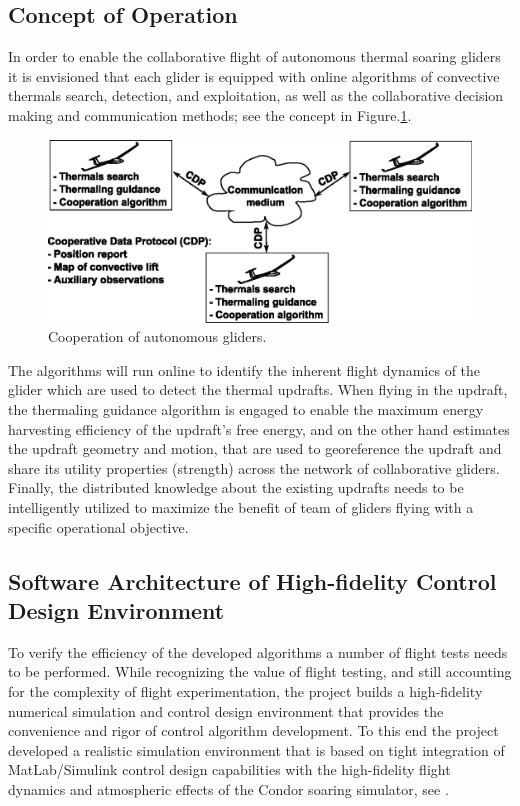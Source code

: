 \documentclass[letterpaper, 10 pt, conference]{ieeeconf}  %
\begin{document}
\subsection{Concept of Operation}
In order to enable the collaborative flight of autonomous thermal soaring
gliders it is envisioned that each glider is equipped with online algorithms
of convective thermals search, detection, and exploitation, as well as the
collaborative decision making and communication methods; see the concept in
Figure.\ref{fig:coop_scheme}.
\begin{figure}[thpb]
  \centering
  \includegraphics[scale=0.6]{Figures/coop_scheme_small.eps}
  \caption{Cooperation of autonomous gliders.}
  \label{fig:coop_scheme}
\end{figure}
The algorithms will run online to identify the inherent flight dynamics of the
glider which are used to detect the thermal updrafts. When flying in the
updraft, the thermaling guidance algorithm is engaged to enable the maximum
energy harvesting efficiency of the updraft’s free energy, and on the other
hand estimates the updraft geometry and motion, that are used to georeference
the updraft and share its utility properties (strength) across the network of
collaborative gliders. Finally, the distributed knowledge about the existing
updrafts needs to be intelligently utilized to maximize the benefit of team
of gliders flying with a specific operational objective.

\subsection{Software Architecture of High-fidelity Control Design Environment}
To verify the efficiency of the developed algorithms a number of flight tests
needs to be performed. While recognizing the value of flight testing, and
still accounting for the complexity of flight experimentation, the project
builds a high-fidelity numerical simulation and control design environment
that provides the convenience and rigor of control algorithm development. To
this end the project developed a realistic simulation environment that is
based on tight integration of MatLab/Simulink \cite{MATLAB:2013} control
design capabilities with the high-fidelity flight dynamics and atmospheric
effects of the Condor soaring simulator, see \cite{Condor:2013:Online}.
\end{document}
